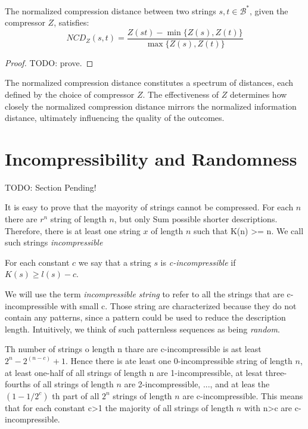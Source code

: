 \begin{proposition}
The normalized compression distance between two strings $s,  t \in \mathcal{B}^{\ast}$, given the compressor $Z$, satisfies:
\[
NCD_Z(s, t) = \frac{ Z(st) - \min\{ Z(s), Z(t) \}}{\max \{ Z(s), Z(t) \} }
\]
\end{proposition}
\begin{proof}
{\color{red} TODO: prove.}
\end{proof}

The normalized compression distance constitutes a spectrum of distances, each defined by the choice of compressor $Z$. The effectiveness of $Z$ determines how closely the normalized compression distance mirrors the normalized information distance, ultimately influencing the quality of the outcomes.


%
%

\section{Incompressibility and Randomness}
\label{sec:incompressibility_randomness}

{\color{red} TODO: Section Pending!}

It is easy to prove that the mayority of strings cannot be compressed. For each $n$ there are $r^n$ string of length $n$, but only Sum possible shorter descriptions. Therefore, there is at least one string $x$ of length $n$ such that K(n) >= n. We call such strings \emph{incompressible}

\begin{definition}
For each constant $c$ we say that a string $s$ is \emph{c-incompressible} if $K(s)\geq l(s)-c$.
\end{definition}

We will use the term \emph{incompressible string} to refer to all the strings that are c-incompressible with small c. Those string are characterized because they do not contain any patterns, since a pattern could be used to reduce the description length. Intuitively, we think of such patternless sequences as being \emph{random}.

Th number of strings o length n thare are c-incompressible is ast least $2^n - 2^(n-c) + 1$. Hence there is ate least one 0-incompressible string of length $n$, at least one-half of all strings of length n are 1-incompressible, at lesat three-fourths of all strings of length $n$ are 2-incompressible, ..., and at leas the $(1-1/2^c)$ th part of all $2^n$ strings of length $n$ are c-incompressible. This means that for each constant c>1 the majority of all strings of length $n$ with n>c are c-incompressible.


